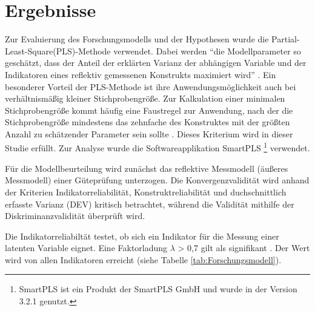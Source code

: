 \section{Ergebnisse}
\label{sec:ergebnisse}
\nocite{lohmoller2013latent}
Zur Evaluierung des Forschungsmodells und der Hypothesen wurde die Partial-Least-Square(PLS)-Methode verwendet. Dabei werden "`die Modellparameter so geschätzt, dass der Anteil der erklärten Varianz der abhängigen Variable und der Indikatoren eines reflektiv gemessenen Konstrukts maximiert wird"' \parencite[S.16]{nitzl2010anwenderorientierte}. Ein besonderer Vorteil der PLS-Methode ist ihre Anwendungsmöglichkeit auch bei verhältnismäßig kleiner Stichprobengröße. Zur Kalkulation einer minimalen Stichprobengröße kommt häufig eine Faustregel zur Anwendung, nach der die Stichprobengröße mindestens das zehnfache des Konstruktes mit der größten Anzahl zu schätzender Parameter sein sollte \parencite[vgl.][S.394]{islam2013investigating}. Dieses Kriterium wird in dieser Studie erfüllt. Zur Analyse wurde die Softwareapplikation SmartPLS \footnote{SmartPLS ist ein Produkt der SmartPLS GmbH und wurde in der Version 3.2.1 genutzt.} verwendet. 

Für die Modellbeurteilung wird zunächst das reflektive Messmodell (äußeres Messmodell) einer Güteprüfung unterzogen. Die Konvergenzvalidität wird anhand der Kriterien Indikatorreliabilität, Konstruktreliabilität und duchschnittlich erfasste Varianz (DEV) kritisch betrachtet, während die Validität mithilfe der Diskriminanzvalidität überprüft wird.

Die Indikatorreliabiltät testet, ob sich ein Indikator für die Messung einer latenten Variable eignet. Eine Faktorladung $\lambda$ > 0,7 gilt als signifikant \parencite[vgl.][S.24]{nitzl2010anwenderorientierte}. Der Wert wird von allen Indikatoren erreicht (siehe Tabelle \ref{tab:Forschungsmodell}). 



